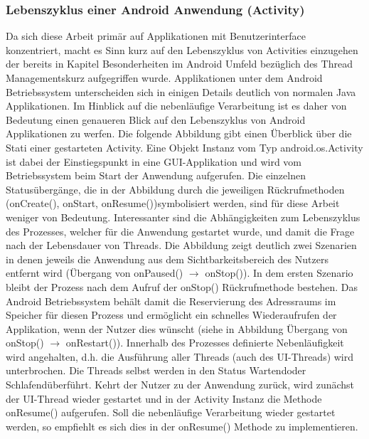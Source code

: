 \documentclass[12pt,oneside,a4paper,bibtotoc,liststotoc]{scrreprt}
\begin{document}
\subsubsection{Lebenszyklus einer Android Anwendung (Activity)}
Da sich diese Arbeit primär auf Applikationen mit Benutzerinterface konzentriert, macht es Sinn kurz auf den Lebenszyklus von Activities einzugehen der bereits in Kapitel \glqq Besonderheiten im Android Umfeld bezüglich des Thread Managements\grqq kurz aufgegriffen wurde.
Applikationen unter dem Android Betriebssystem unterscheiden sich in einigen Details deutlich von normalen Java Applikationen. Im Hinblick auf die nebenläufige Verarbeitung ist es daher von Bedeutung einen genaueren Blick auf den Lebenszyklus von Android Applikationen zu werfen. Die folgende Abbildung gibt einen Überblick über die Stati einer gestarteten Activity. Eine Objekt Instanz vom Typ android.os.Activity ist dabei der Einstiegspunkt in eine GUI-Applikation und wird vom Betriebssystem beim Start der Anwendung aufgerufen. Die einzelnen Statusübergänge, die in der Abbildung durch die jeweiligen Rückrufmethoden (onCreate(), onStart, onResume())symbolisiert werden,  sind für diese Arbeit weniger von Bedeutung. Interessanter sind die Abhängigkeiten zum Lebenszyklus des Prozesses, welcher für die Anwendung gestartet wurde, und damit die Frage nach der Lebensdauer von Threads. Die Abbildung zeigt deutlich zwei Szenarien in denen jeweils die Anwendung aus dem Sichtbarkeitsbereich des Nutzers entfernt wird (Übergang von onPaused() $\rightarrow$  onStop()). In dem ersten Szenario bleibt der Prozess nach dem Aufruf der onStop() Rückrufmethode bestehen. Das Android Betriebssystem behält damit die Reservierung des Adressraums im Speicher für diesen Prozess und ermöglicht ein schnelles Wiederaufrufen der Applikation, wenn der Nutzer dies wünscht (siehe in Abbildung Übergang von onStop() $\rightarrow$   onRestart()). Innerhalb des Prozesses definierte Nebenläufigkeit wird angehalten, d.h. die Ausführung aller Threads (auch des UI-Threads) wird unterbrochen. Die Threads selbst werden in den Status \glqq Wartend\grqq oder \glqq Schlafend\grqq überführt. Kehrt der Nutzer zu der Anwendung zurück, wird zunächst der UI-Thread wieder gestartet und in der Activity Instanz die Methode onResume() aufgerufen. Soll die nebenläufige Verarbeitung wieder gestartet werden, so empfiehlt es sich dies in der onResume() Methode zu implementieren.
\end{document}
